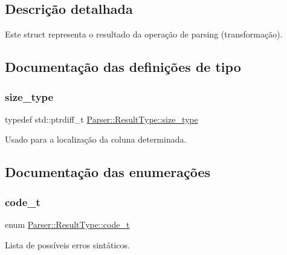 \subsection{Descrição detalhada}
Este struct representa o resultado da operação de parsing (transformação). 

\subsection{Documentação das definições de tipo}
\mbox{\label{structParser_1_1ResultType_a8f110ce090aad3f4016d241aaef768db}} 
\subsubsection{\texorpdfstring{size\+\_\+type}{size\_type}}
{\footnotesize\ttfamily typedef std\+::ptrdiff\+\_\+t \hyperlink{structParser_1_1ResultType_a8f110ce090aad3f4016d241aaef768db}{Parser\+::\+Result\+Type\+::size\+\_\+type}}



Usado para a localização da coluna determinada. 



\subsection{Documentação das enumerações}
\mbox{\label{structParser_1_1ResultType_ac63a3ce34d7a6a119b1902372116d457}} 
\subsubsection{\texorpdfstring{code\+\_\+t}{code\_t}}
{\footnotesize\ttfamily enum \hyperlink{structParser_1_1ResultType_ac63a3ce34d7a6a119b1902372116d457}{Parser\+::\+Result\+Type\+::code\+\_\+t}}



Lista de possíveis erros sintáticos. 

